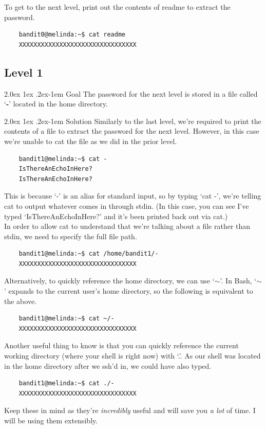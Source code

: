\documentclass[11pt]{article}
\makeatletter
\renewcommand{\paragraph}{%
  \@startsection{paragraph}{4}%
  {\z@}{2.0ex \@plus 1ex \@minus .2ex}{-1em}%
  {\normalfont\normalsize\bfseries}%
}
\makeatother
\begin{document}
To get to the next level, print out the contents of readme to extract the password. 
\begin{lstlisting}
 	bandit0@melinda:~$ cat readme 
 	XXXXXXXXXXXXXXXXXXXXXXXXXXXXXXXX
\end{lstlisting}
\newpage
\subsection{Level 1}
\paragraph{Goal}
The password for the next level is stored in a file called `\textbf{-}' located in the home directory.

\paragraph{Solution}
Similarly to the last level, we're required to print the contents of a file to extract the password for the next level. However, in this case we're unable to cat the file as we did in the prior level.
\begin{lstlisting}
	bandit1@melinda:~$ cat -  
	IsThereAnEchoInHere?
	IsThereAnEchoInHere?
\end{lstlisting}
This is because `-' is an alias for standard input, so by typing `cat -', we're telling cat to output whatever comes in through stdin. (In this case, you can see I've typed `IsThereAnEchoInHere?' and it's been printed back out via cat.)\\

In order to allow cat to understand that we're talking about a file rather than stdin, we need to specify the full file path.
\begin{lstlisting}
	bandit1@melinda:~$ cat /home/bandit1/-
	XXXXXXXXXXXXXXXXXXXXXXXXXXXXXXXX
\end{lstlisting}
Alternatively, to quickly reference the home directory, we can use `$\sim$'. In Bash, `$\sim$' expands to the current user's home directory, so the following is equivalent to the above.
\begin{lstlisting}
	bandit1@melinda:~$ cat ~/-
	XXXXXXXXXXXXXXXXXXXXXXXXXXXXXXXX
\end{lstlisting}
Another useful thing to know is that you can quickly reference the current working directory (where your shell is right now) with `.'. As our shell was located in the home directory after we ssh'd in, we could have also typed.
\begin{lstlisting}
	bandit1@melinda:~$ cat ./-
	XXXXXXXXXXXXXXXXXXXXXXXXXXXXXXXX
\end{lstlisting}
Keep these in mind as they're \textit{incredibly} useful and will save you \textit{a lot} of time. I will be using them extensibly.
\end{document}
